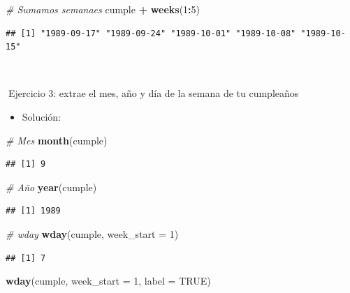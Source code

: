 \documentclass[11pt,]{book}
\newenvironment{Shaded}{\begin{snugshade}}{\end{snugshade}}
\newcommand{\CommentTok}[1]{\textcolor[rgb]{0.37,0.37,0.37}{\textit{#1}}}
\newcommand{\DataTypeTok}[1]{\textcolor[rgb]{0.27,0.27,0.27}{#1}}
\newcommand{\DecValTok}[1]{\textcolor[rgb]{0.06,0.06,0.06}{#1}}
\newcommand{\KeywordTok}[1]{\textcolor[rgb]{0.27,0.27,0.27}{\textbf{#1}}}
\newcommand{\NormalTok}[1]{#1}
\newcommand{\OperatorTok}[1]{\textcolor[rgb]{0.43,0.43,0.43}{\textbf{#1}}}
\newcommand{\OtherTok}[1]{\textcolor[rgb]{0.37,0.37,0.37}{#1}}
\newcommand{\StringTok}[1]{\textcolor[rgb]{0.5,0.5,0.5}{#1}}
\providecommand{\tightlist}{%
  \setlength{\itemsep}{0pt}\setlength{\parskip}{0pt}}
\begin{document}
\begin{Shaded}
\begin{Highlighting}[]
\CommentTok{# Sumamos semanaes}
\NormalTok{cumple }\OperatorTok{+}\StringTok{ }\KeywordTok{weeks}\NormalTok{(}\DecValTok{1}\OperatorTok{:}\DecValTok{5}\NormalTok{)}
\end{Highlighting}
\end{Shaded}

\begin{verbatim}
## [1] "1989-09-17" "1989-09-24" "1989-10-01" "1989-10-08" "1989-10-15"
\end{verbatim}

~

📝Ejercicio 3: extrae el mes, año y día de la semana de tu cumpleaños

\begin{itemize}
\tightlist
\item
  Solución:
\end{itemize}

\begin{Shaded}
\begin{Highlighting}[]
\CommentTok{# Mes}
\KeywordTok{month}\NormalTok{(cumple)}
\end{Highlighting}
\end{Shaded}

\begin{verbatim}
## [1] 9
\end{verbatim}

\begin{Shaded}
\begin{Highlighting}[]
\CommentTok{# Año }
\KeywordTok{year}\NormalTok{(cumple)}
\end{Highlighting}
\end{Shaded}

\begin{verbatim}
## [1] 1989
\end{verbatim}

\begin{Shaded}
\begin{Highlighting}[]
\CommentTok{# wday}
\KeywordTok{wday}\NormalTok{(cumple, }\DataTypeTok{week_start =} \DecValTok{1}\NormalTok{)}
\end{Highlighting}
\end{Shaded}

\begin{verbatim}
## [1] 7
\end{verbatim}

\begin{Shaded}
\begin{Highlighting}[]
\KeywordTok{wday}\NormalTok{(cumple, }\DataTypeTok{week_start =} \DecValTok{1}\NormalTok{, }\DataTypeTok{label =} \OtherTok{TRUE}\NormalTok{)}
\end{Highlighting}
\end{Shaded}
\end{document}
